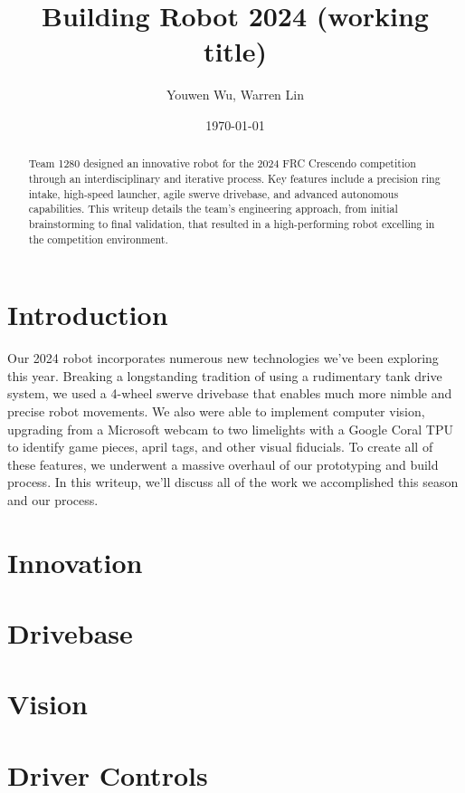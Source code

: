 




\title{Building Robot 2024 (working title)}
\author{Youwen Wu, Warren Lin}
\date{\today}
\maketitle

\begin{abstract}
  Team 1280 designed an innovative robot for the 2024 FRC Crescendo
  competition through an interdisciplinary and iterative process. Key
  features include a precision ring intake, high-speed launcher, agile
  swerve drivebase, and advanced autonomous capabilities. This writeup
  details the team's engineering approach, from initial brainstorming to
  final validation, that resulted in a high-performing robot excelling
  in the competition environment.
\end{abstract}


\section{Introduction}

Our 2024 robot incorporates numerous new technologies we've been
exploring this year. Breaking a longstanding tradition of using a
rudimentary tank drive system, we used a 4-wheel swerve drivebase that
enables much more nimble and precise robot movements. We also were able
to implement computer vision, upgrading from a Microsoft webcam to two
limelights with a Google Coral TPU to identify game pieces, april tags,
and other visual fiducials. To create all of these features, we
underwent a massive overhaul of our prototyping and build process. In
this writeup, we'll discuss all of the work we accomplished this season
and our process.

\section{Innovation}




\section{Drivebase}



\section{Vision}



\section{Driver Controls}




\printbibliography

